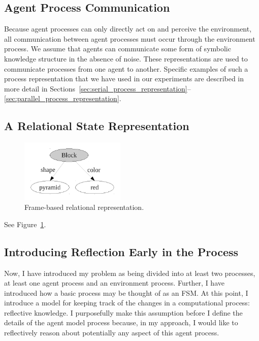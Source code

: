 \subsection{Agent Process Communication}

Because agent processes can only directly act on and perceive the
environment, all communication between agent processes must occur
through the environment process.  We assume that agents can
communicate some form of symbolic knowledge structure in the absence
of noise.  These representations are used to communicate processes
from one agent to another.  Specific examples of such a process
representation that we have used in our experiments are described in
more detail in
Sections~\ref{sec:serial_process_representation}--\ref{sec:parallel_process_representation}.


\subsection{A Relational State Representation}

\begin{figure}[bth]
  \center
  \includegraphics[height=3cm]{gfx/frame_representation}
  \caption[Frame-based relational representation]{Frame-based relational representation.}
  \label{fig:frame_representation}
\end{figure}

See Figure~\ref{fig:frame_representation}.

\subsection{Introducing Reflection Early in the Process}

Now, I have introduced my problem as being divided into at least two
processes, at least one agent process and an environment process.
Further, I have introduced how a basic process may be thought of as an
\ac{FSM}.  At this point, I introduce a model for keeping track of the
changes in a computational process: reflective knowledge.  I
purposefully make this assumption before I define the details of the
agent model process because, in my approach, I would like to
reflectively reason about potentially any aspect of this agent
process.


